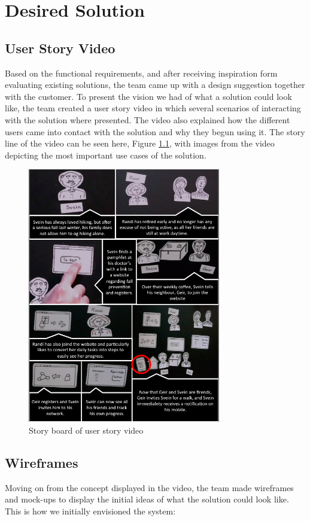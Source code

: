 \chapter{Desired Solution}
\section{User Story Video}
Based on the functional requirements, and after receiving inspiration form evaluating existing solutions, the team came up with a design suggestion together with the customer. To present the vision we had of what a solution could look like, the team created a user story video \cite{video} in which several scenarios of interacting with the solution where presented. The video also explained how the different users came into contact with the solution and why they begun using it. The story line of the video can be seen here, Figure \ref{fig:video}, with images from the video depicting the most important use cases of the solution. 

\begin{figure}[H]
\centering
\includegraphics[width = 0.75\textwidth]{Figures/VideoImages}
\caption{Story board of user story video}
    \label{fig:video}
    \end{figure}

\section{Wireframes}
Moving on from the concept displayed in the video, the team made wireframes and mock-ups to display the initial ideas of what the solution could look like. This is how we initially envisioned the system: 


